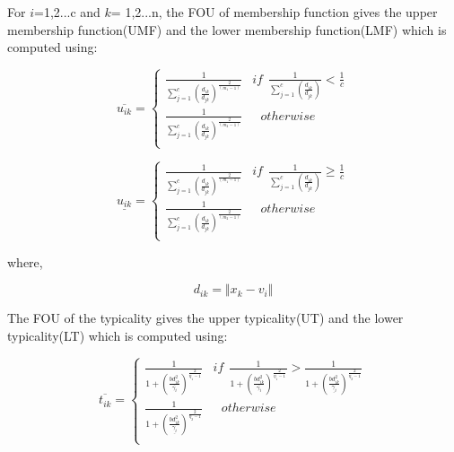 \documentclass[journal, onecolumn]{IEEEtran}
\begin{document}
For $i$=1,2...c and $k$= 1,2...n, the FOU of membership function gives the upper membership function(UMF) and the lower membership function(LMF) which is computed using: 




\begin{equation}
 \overline{u_{ik}} =
  \begin{cases}
               \frac{1}{\sum_{j=1}^c (\frac{d_{ik}}{d_{jk}})^{\frac{2}{(m_1-1)}}}                     & if \:\: \frac{1}{\sum_{j=1}^c (\frac{d_{ik}}{d_{jk}})} < \frac{1}{c} \\
 \frac{1}{\sum_{j=1}^c (\frac{d_{ik}}{d_{jk}})^{\frac{2}{(m_2-1)}}} &\:\:\:otherwise \\
 
  \end{cases}
\end{equation}

\begin{equation}
 \underline{u_{ik}} =
  \begin{cases}
               \frac{1}{\sum_{j=1}^c (\frac{d_{ik}}{d_{jk}})^{\frac{2}{(m_1-1)}}}                     & if \:\: \frac{1}{\sum_{j=1}^c (\frac{d_{ik}}{d_{jk}})} \geq \frac{1}{c} \\
 \frac{1}{\sum_{j=1}^c (\frac{d_{ik}}{d_{jk}})^{\frac{2}{(m_2-1)}}} &\:\:\:otherwise \\
 
  \end{cases}
\end{equation}

where, 

\begin{equation}
d_{ik}=\Vert x_k - v_i \Vert
\end{equation}


The FOU of the typicality gives the upper typicality(UT) and the lower typicality(LT)  which is computed using: 

\begin{equation}
 \overline{t_{ik}} =
  \begin{cases}
               \frac{1}{1+ (\frac{b d_{ik}^2}{\overline{\gamma_i}})^{\frac{2}{\eta_1-1}}}                     & if \:\: \frac{1}{1+ (\frac{b d_{ik}^2}{\overline{\gamma_i}})^{\frac{2}{\eta_1-1}}} > \frac{1}{1+ (\frac{ b d_{ik}^2}{\underline{\gamma_i}})^{\frac{2}{\eta_2-1}}} \\
 \frac{1}{1+ (\frac{b d_{ik}^2}{\underline{\gamma_i}})^{\frac{2}{\eta_2-1}}}  &\:\:\:otherwise \\
 
  \end{cases}
\end{equation}
\end{document}
